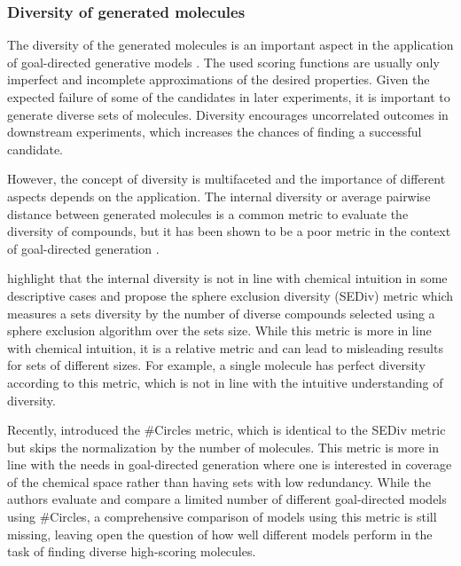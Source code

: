\subsubsection{Diversity of generated molecules}
The diversity of the generated molecules is an important aspect in the application of goal-directed
generative models \citep{martinDiverseViewpointsComputational2001,gorseDiversityMedicinalChemistry2006}. The used scoring functions are usually only imperfect and incomplete
approximations of the desired properties. Given the expected failure of some of the candidates in
later experiments, it is important to generate diverse sets of molecules.
Diversity encourages uncorrelated outcomes in downstream experiments, which increases
the chances of finding a successful candidate.

However, the concept of diversity is multifaceted and the importance of different aspects depends on
the application. The internal diversity or average pairwise distance between generated molecules is
a common metric to evaluate the diversity of compounds, but it has been shown to be a poor metric in
the context of goal-directed generation
\citep{waldmanNovelAlgorithmsOptimization2000,xieMARSMarkovMolecular2021,thomasComparisonStructureLigandbased2021}.

\citet{thomasComparisonStructureLigandbased2021} highlight that the internal diversity is not in
line with chemical intuition in some descriptive cases and propose the sphere exclusion diversity
(SEDiv) metric which measures a sets diversity by the number of diverse compounds selected using a
sphere exclusion algorithm \citep{gobbiDISEDirectedSphere2003,sayle2DSimilarityDiversity2019} over the sets size. While this metric is more in line with chemical intuition, it is a
relative metric and can lead to misleading results for sets of different sizes. For example, a
single molecule has perfect diversity according to this metric, which is not in line with the
intuitive understanding of diversity.

Recently, \citet{xieHowMuchSpace2023} introduced the \#Circles metric, which is identical to the
SEDiv metric but skips the normalization by the number of molecules. This metric is more in line
with the needs in goal-directed generation where one is interested in coverage of the chemical space
rather than having sets with low redundancy. While the authors evaluate and compare a limited number
of different goal-directed models using \#Circles, a comprehensive comparison of models using this
metric is still missing, leaving open the question of how well different models perform in the task
of finding diverse high-scoring molecules.

